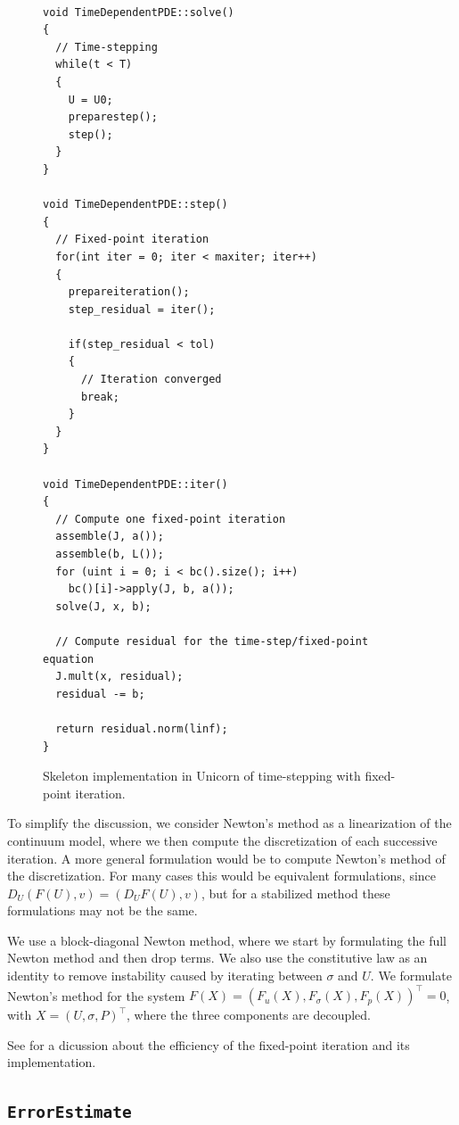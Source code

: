 \begin{figure}[!h]
{\small
\begin{lstlisting}

void TimeDependentPDE::solve()
{
  // Time-stepping
  while(t < T)
  {
    U = U0;
    preparestep();
    step();
  }
}

void TimeDependentPDE::step()
{
  // Fixed-point iteration
  for(int iter = 0; iter < maxiter; iter++)
  {
    prepareiteration();
    step_residual = iter();

    if(step_residual < tol)
    {
      // Iteration converged
      break;
    }
  }
}

void TimeDependentPDE::iter()
{
  // Compute one fixed-point iteration
  assemble(J, a());
  assemble(b, L());
  for (uint i = 0; i < bc().size(); i++)
    bc()[i]->apply(J, b, a());
  solve(J, x, b);

  // Compute residual for the time-step/fixed-point equation
  J.mult(x, residual);
  residual -= b;

  return residual.norm(linf);
}
\end{lstlisting}
}
\label{code:time-stepping}
\caption{
Skeleton implementation in Unicorn of time-stepping with fixed-point
iteration.}
\end{figure}

To simplify the discussion, we consider Newton's method as a
linearization of the continuum model, where we then compute the
discretization of each successive iteration. A more general
formulation would be to compute Newton's method of the
discretization. For many cases this would be equivalent formulations,
since $D_U (F(U), v) = (D_U F(U), v)$, but for a stabilized method
these formulations may not be the same.

We use a block-diagonal Newton method, where we start by formulating
the full Newton method and then drop terms. We also use the
constitutive law as an identity to remove instability caused by
iterating between $\sigma$ and $U$. We formulate Newton's method for
the system $F(X) = (F_u(X), F_\sigma(X), F_p(X))^\top = 0$, with $X =
(U, \sigma, P)^\top$, where the three components are decoupled.

See \cite{Jansson2009} for a dicussion about
the efficiency of the fixed-point iteration and its implementation.

\subsection{\tt ErrorEstimate}

